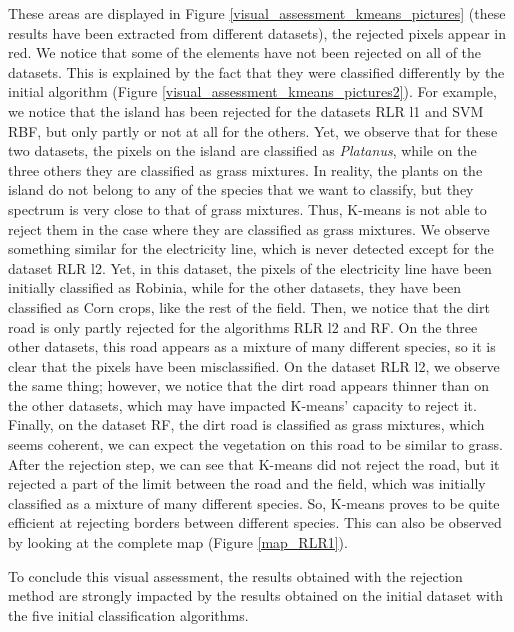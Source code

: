 \documentclass{siamart171218}
\begin{document}
These areas are displayed in Figure \ref{visual_assessment_kmeans_pictures} (these results have been extracted from different datasets), the rejected pixels appear in red. We notice that some of the elements have not been rejected on all of the datasets. This is explained by the fact that they were classified differently by the initial algorithm (Figure \ref{visual_assessment_kmeans_pictures2}). For example, we notice that the island has been rejected for the datasets RLR l1 and SVM RBF, but only partly or not at all for the others. Yet, we observe that for these two datasets, the pixels on the island are classified as \textit{Platanus}, while on the three others they are classified as grass mixtures. In reality, the plants on the island do not belong to any of the species that we want to classify, but they spectrum is very close to that of grass mixtures. Thus, K-means is not able to reject them in the case where they are classified as grass mixtures. We observe something similar for the electricity line, which is never detected except for the dataset RLR l2. Yet, in this dataset, the pixels of the electricity line have been initially classified as Robinia, while for the other datasets, they have been classified as Corn crops, like the rest of the field. Then, we notice that the dirt road is only partly rejected for the algorithms RLR l2 and RF. On the three other datasets, this road appears as a mixture of many different species, so it is clear that the pixels have been misclassified. On the dataset RLR l2, we observe the same thing; however, we notice that the dirt road appears thinner than on the other datasets, which may have impacted K-means' capacity to reject it. Finally, on the dataset RF, the dirt road is classified as grass mixtures, which seems coherent, we can expect the vegetation on this road to be similar to grass. After the rejection step, we can see that K-means did not reject the road, but it rejected a part of the limit between the road and the field, which was initially classified as a mixture of many different species. So, K-means proves to be quite efficient at rejecting borders between different species. This can also be observed by looking at the complete map (Figure \ref{map_RLR1}).

To conclude this visual assessment, the results obtained with the rejection method are strongly impacted by the results obtained on the initial dataset with the five initial classification algorithms. 
\end{document}
